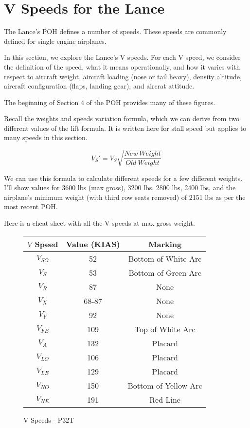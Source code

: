 \section{V Speeds for the Lance}

The Lance's POH defines a number of speeds. These speeds are commonly defined for single engine airplanes.

In this section, we explore the Lance's V speeds. For each V speed, we consider the definition of the speed, what it means operationally, and how it varies with respect to aircraft weight, aircraft loading (nose or tail heavy), density altitude, aircraft configuration (flaps, landing gear), and aircrat attitude.

The beginning of Section 4 of the POH provides many of these figures.

Recall the weights and speeds variation formula, which we can derive from two different values of the lift formula. It is written here for stall speed but applies to many speeds in this section.

\begin{equation}
V_S' = V_S \sqrt{\frac{New\ Weight}{Old\ Weight}}
\end{equation}

We can use this formula to calculate different speeds for a few different weights. I'll show values for 3600 lbs (max gross), 3200 lbs, 2800 lbs, 2400 lbs, and the airplane's minimum weight (with third row seats removed) of 2151 lbs as per the most recent POH.

Here is a cheat sheet with all the V speeds at max gross weight.

\begin{figure}
\begin{center}
\begin{tabular}{ |c|c|c| }
    \hline
    $V$ Speed & Value (KIAS) & Marking\\
    \hline
    \hline
     $V_{SO}$ &  52 & Bottom of White Arc \\
     $V_S$    &  53 & Bottom of Green Arc \\
    \hline
     $V_R$    &  87 & None \\
    \hline
     $V_X$    &  68-87 & None \\
     $V_Y$    &  92    & None \\
    \hline
     $V_{FE}$ &  109 & Top of White Arc \\
     $V_A$    &  132 & Placard \\
    \hline
     $V_{LO}$ &  106 & Placard \\
     $V_{LE}$ &  129 & Placard \\
    \hline
     $V_{NO}$ &  150 & Bottom of Yellow Arc \\
     $V_{NE}$ &  191 & Red Line \\
    \hline
\end{tabular}
\end{center}
\caption{V Speeds - P32T}
\label{fig:VSpeedsP32T}
\end{figure}

